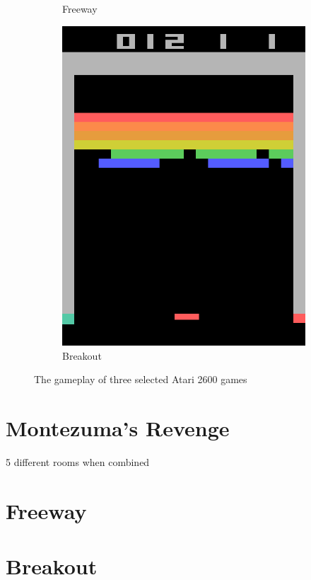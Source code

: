 \documentclass[draft,final]{vutinfth} %
\begin{document}
\begin{figure}[h]
\begin{center}
\begin{subfigure}{.3\textwidth}
                \caption{Freeway}
                \label{fig:fway}
            \end{subfigure}
            \begin{subfigure}{.3\textwidth}
                \centering
                \includegraphics[width=.8\linewidth]{figures/breakout.png}
                \caption{Breakout}
                \label{fig:break}
            \end{subfigure} \caption{The gameplay of three selected Atari 2600 games}
            \label{fig:games}
        \end{center}
    \end{figure}


    \section{Montezuma's Revenge}
    5 different rooms when combined


    \section{Freeway}


    \section{Breakout}
\end{document}
